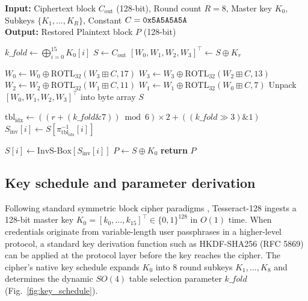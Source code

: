\documentclass[review,12pt]{elsarticle}
\begin{document}
\begin{algorithm}[htbp]
\footnotesize
\caption{Tesseract-128 decryption pipeline.}
\label{alg:tesseract_dec}
\textbf{Input:} Ciphertext block $C_{\text{out}}$ (128-bit), Round count $R=8$, Master key $K_0$, Subkeys $\{K_1, \dots, K_R\}$, Constant $C = \text{\texttt{0x5A5A5A5A}}$ \\
\textbf{Output:} Restored Plaintext block $P$ (128-bit)
\begin{algorithmic}[1]
\STATE {}
\STATE $\mathit{k\_fold} \leftarrow \bigoplus_{i=0}^{15} K_0[i]$
\STATE $S \leftarrow C_{\text{out}}$
    \STATE {}
    \STATE $[W_0, W_1, W_2, W_3]^\top \leftarrow S \oplus K_r$
    
    \STATE {}
    \STATE $W_0 \leftarrow W_0 \oplus \text{ROTL}_{32}(W_3 \boxplus C, 17)$
    \STATE $W_3 \leftarrow W_3 \oplus \text{ROTL}_{32}(W_2 \boxplus C, 13)$
    \STATE $W_2 \leftarrow W_2 \oplus \text{ROTL}_{32}(W_1 \boxplus C, 11)$
    \STATE $W_1 \leftarrow W_1 \oplus \text{ROTL}_{32}(W_0 \boxplus C, 7)$
    \STATE Unpack $[W_0, W_1, W_2, W_3]^\top$ into byte array $S$
    
    \STATE {}
    \STATE $\text{tbl}_{\text{idx}} \leftarrow \left( (r + (\mathit{k\_fold} \mathbin{\&} 7)) \bmod 6 \right) \times 2 + ((\mathit{k\_fold} \gg 3) \mathbin{\&} 1)$
        \STATE $S_{\text{inv}}[i] \leftarrow S[\pi_{\text{tbl}_{\text{idx}}}^{-1}[i]]$
    \ENDFOR
    
    \STATE {}
        \STATE $S[i] \leftarrow \text{InvS-Box}[S_{\text{inv}}[i]]$
    \ENDFOR
\ENDFOR
\STATE {}
\STATE $P \leftarrow S \oplus K_0$
\STATE \textbf{return} $P$
\end{algorithmic}
\end{algorithm}

\subsection{Key schedule and parameter derivation}
Following standard symmetric block cipher paradigms \cite{nist2001fips}, Tesseract-128 ingests a 128-bit master key $K_0 = [k_0, \dots, k_{15}]^\top \in \{0, 1\}^{128}$ in $O(1)$ time. When credentials originate from variable-length user passphrases in a higher-level protocol, a standard key derivation function such as HKDF-SHA256 (RFC 5869) can be applied at the protocol layer before the key reaches the cipher. The cipher's native key schedule expands $K_0$ into 8 round subkeys $K_1, \dots, K_8$ and determines the dynamic $SO(4)$ table selection parameter $\mathit{k\_fold}$ (Fig.~\ref{fig:key_schedule}).
\end{document}
